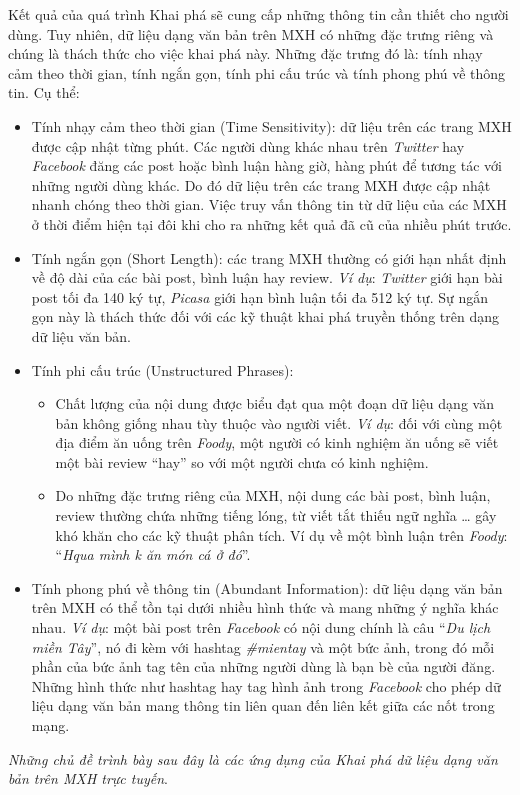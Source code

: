 \documentclass[12pt]{extarticle}
\begin{document}
			\par Kết quả của quá trình Khai phá sẽ cung cấp những thông tin cần thiết cho người dùng. Tuy nhiên, dữ liệu dạng văn bản trên MXH có những đặc trưng riêng và chúng là thách thức cho việc khai phá này. Những đặc trưng đó là: tính nhạy cảm theo thời gian, tính ngắn gọn, tính phi cấu trúc và tính phong phú về thông tin. Cụ thể:
			\begin{itemize}
				\item Tính nhạy cảm theo thời gian (Time Sensitivity): dữ liệu trên các trang MXH được cập nhật từng phút. Các người dùng khác nhau trên \textit{Twitter} hay \textit{Facebook} đăng các post hoặc bình luận hàng giờ, hàng phút để tương tác với những người dùng khác. Do đó dữ liệu trên các trang MXH được cập nhật nhanh chóng theo thời gian. Việc truy vấn thông tin từ dữ liệu của các MXH ở thời điểm hiện tại đôi khi cho ra những kết quả đã cũ của nhiều phút trước.  
				\item Tính ngắn gọn (Short Length): các trang MXH thường có giới hạn nhất định về độ dài của các bài post, bình luận hay review. \textit{Ví dụ}: \textit{Twitter} giới hạn bài post tối đa 140 ký tự, \textit{Picasa} giới hạn bình luận tối đa 512 ký tự. Sự ngắn gọn này là thách thức đối với các kỹ thuật khai phá truyền thống trên dạng dữ liệu văn bản.
				\item Tính phi cấu trúc (Unstructured Phrases):
					\begin{itemize}
						\item Chất lượng của nội dung được biểu đạt qua một đoạn dữ liệu dạng văn bản không giống nhau tùy thuộc vào người viết. \textit{Ví dụ}: đối với cùng một địa điểm ăn uống trên \textit{Foody}, một người có kinh nghiệm ăn uống sẽ viết một bài review “hay” so với một người chưa có kinh nghiệm.
						\item Do những đặc trưng riêng của MXH, nội dung các bài post, bình luận, review thường chứa những tiếng lóng, từ viết tắt thiếu ngữ nghĩa … gây khó khăn cho các kỹ thuật phân tích. Ví dụ về một bình luận trên \textit{Foody}: “\textit{Hqua mình k ăn món cá ở đó}”.
					\end{itemize}
				\item Tính phong phú về thông tin (Abundant Information): dữ liệu dạng văn bản trên MXH có thể tồn tại dưới nhiều hình thức và mang những ý nghĩa khác nhau. \textit{Ví dụ}: một bài post trên \textit{Facebook} có nội dung chính là câu “\textit{Du lịch miền Tây}”, nó đi kèm với hashtag \textit{\#mientay} và một bức ảnh, trong đó mỗi phần của bức ảnh tag tên của những người dùng là bạn bè của người đăng. Những hình thức như hashtag hay tag hình ảnh trong \textit{Facebook} cho phép dữ liệu dạng văn bản mang thông tin liên quan đến liên kết giữa các nốt trong mạng.
			\end{itemize}
			\par \textit{Những chủ đề trình bày sau đây là các ứng dụng của Khai phá dữ liệu dạng văn bản trên MXH trực tuyến}.
					
\end{document}
